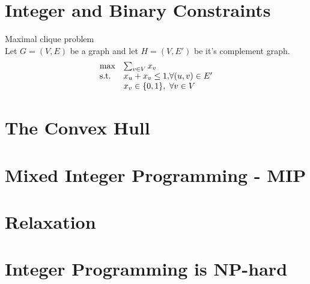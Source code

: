 \section{Integer and Binary Constraints}
\begin{example}\label{clique}
Maximal clique problem\\
Let $G=(V,E)$ be a graph and let $H=(V,E')$ be it's complement   graph.
\begin{align}
\begin{array}{ll@{}ll}
\text{max} &\sum_{v\in V} x_v&\\
\text{s.t.} &x_u + x_v \leq 1,& \forall (u,v) \in E'\\
&x_v\in\{0,1\},& \forall v \in V\\
\end{array}
\end{align}
\end{example}
\section{The Convex Hull}
\section{Mixed Integer Programming - MIP}
\section{Relaxation}
\section{Integer Programming is NP-hard}